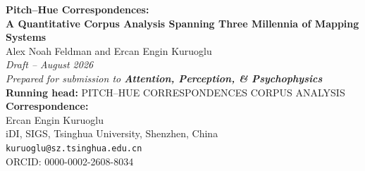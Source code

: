 \documentclass[12pt]{article}
\begin{document}
\begin{titlepage}
\begin{center}
\vspace*{2cm}
{\Large\bfseries Pitch--Hue Correspondences:\\[6pt]
A Quantitative Corpus Analysis Spanning Three Millennia of Mapping Systems}\\[2em]

{\large Alex Noah Feldman and Ercan Engin Kuruoglu}\\[0.75em]

\textit{Draft -- August 2026}\\[0.5em]
\textit{Prepared for submission to \textbf{Attention, Perception, \& Psychophysics}}\\[3em]

\textbf{Running head:} PITCH--HUE CORRESPONDENCES CORPUS ANALYSIS\\[3em]

\textbf{Correspondence:}\\
Ercan Engin Kuruoglu\\
iDI, SIGS, Tsinghua University, Shenzhen, China\\
\texttt{kuruoglu@sz.tsinghua.edu.cn}\\
ORCID: 0000-0002-2608-8034

\end{center}
\end{titlepage}
\end{document}
